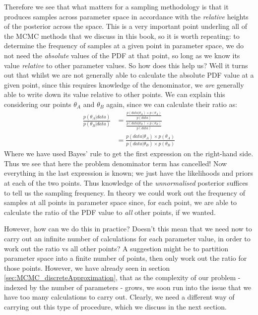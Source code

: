\documentclass[11pt,fullpage]{book}
\begin{document}
Therefore we see that what matters for a sampling methodology is that it produces samples across parameter space in accordance with the \textit{relative} heights of the posterior across the space. This is a very important point underling all of the MCMC methods that we discuss in this book, so it is worth repeating: to determine the frequency of samples at a given point in parameter space, we do not need the \textit{absolute} values of the PDF at that point, so long as we know its value \textit{relative} to other parameter values. So how does this help us? Well it turns out that whilst we are not generally able to calculate the absolute PDF value at a given point, since this requires knowledge of the denominator, we \textit{are} generally able to write down its value relative to other points. We can explain this considering our points $\theta_A$ and $\theta_B$ again, since we can calculate their ratio as:
%
\begin{align}
\frac{p(\theta_A|data)}{p(\theta_B|data)} &= \frac{\frac{p(data|\theta_A)\times p(\theta_A)}{p(data)}}{\frac{p(data|\theta_B)\times p(\theta_B)}{p(data)}}\\
&=\frac{p(data|\theta_A)\times p(\theta_A)}{p(data|\theta_B)\times p(\theta_B)}
\end{align}
%
Where we have used Bayes' rule to get the first expression on the right-hand side. Thus we see that here the problem denominator term has cancelled! Now everything in the last expression is known; we just have the likelihoods and priors at each of the two points. Thus knowledge of the \textit{unnormalised} posterior suffices to tell us the sampling frequency. In theory we could work out the frequency of samples at all points in parameter space since, for each point, we are able to calculate the ratio of the PDF value to \textit{all} other points, if we wanted.

However, how can we do this in practice? Doesn't this mean that we need now to carry out an infinite number of calculations for each parameter value, in order to work out the ratio vs all other points? A suggestion might be to partition parameter space into a finite number of points, then only work out the ratio for those points. However, we have already seen in section \ref{sec:MCMC_discreteApproximation}, that as the complexity of our problem - indexed by the number of parameters - grows, we soon run into the issue that we have too many calculations to carry out. Clearly, we need a different way of carrying out this type of procedure, which we discuss in the next section.
\end{document}
